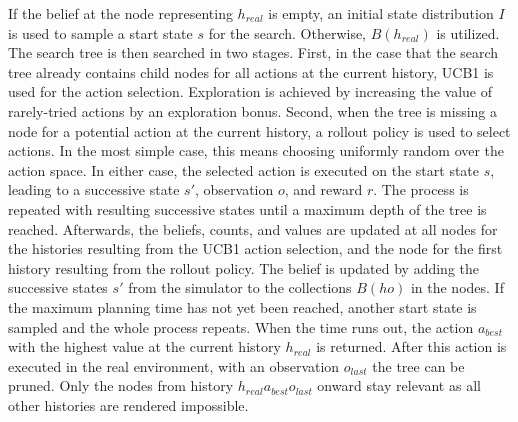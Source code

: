 If the belief at the node representing $h_{real}$ is empty, an initial state distribution $I$ is used to sample a start state $s$ for the search. Otherwise, $B(h_{real})$ is utilized. The search tree is then searched in two stages. First, in the case that the search tree already contains child nodes for all actions at the current history, UCB1 is used for the action selection. Exploration is achieved by increasing the value of rarely-tried actions by an exploration bonus. Second, when the tree is missing a node for a potential action at the current history, a rollout policy is used to select actions. In the most simple case, this means choosing uniformly random over the action space. In either case, the selected action is executed on the start state $s$, leading to a successive state $s'$, observation $o$, and reward $r$. The process is repeated with resulting successive states until a maximum depth of the tree is reached. Afterwards, the beliefs, counts, and values are updated at all nodes for the histories resulting from the UCB1 action selection, and the node for the first history resulting from the rollout policy. The belief is updated by adding the successive states $s'$ from the simulator to the collections $B(ho)$ in the nodes. If the maximum planning time has not yet been reached, another start state is sampled and the whole process repeats. When the time runs out, the action $a_{best}$ with the highest value at the current history $h_{real}$ is returned. After this action is executed in the real environment, with an observation $o_{last}$ the tree can be pruned. Only the nodes from history $h_{real}a_{best}o_{last}$ onward stay relevant as all other histories are rendered impossible.




%



